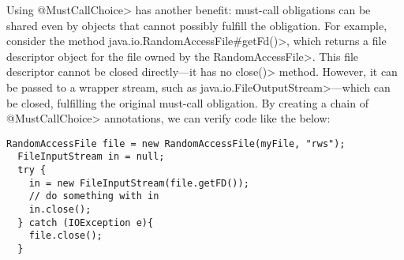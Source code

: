 Using \<@MustCallChoice> has another benefit: must-call obligations
can be shared even by objects that cannot possibly fulfill the
obligation. For example, consider the method
\<java.io.RandomAccessFile\#getFd()>, which returns a file descriptor
object for the file owned by the \<RandomAccessFile>. This file
descriptor cannot be closed directly---it has no \<close()> method.
However, it can be passed to a wrapper stream, such as
\<java.io.FileOutputStream>---which can be closed, fulfilling
the original must-call obligation. By creating a chain of \<@MustCallChoice>
annotations, we can verify code like the below:

\begin{lstlisting}[frame=tb,belowskip=3mm]
  RandomAccessFile file = new RandomAccessFile(myFile, "rws");
  FileInputStream in = null;
  try {
    in = new FileInputStream(file.getFD());
    // do something with in  
    in.close();
  } catch (IOException e){
    file.close();
  }
\end{lstlisting}
